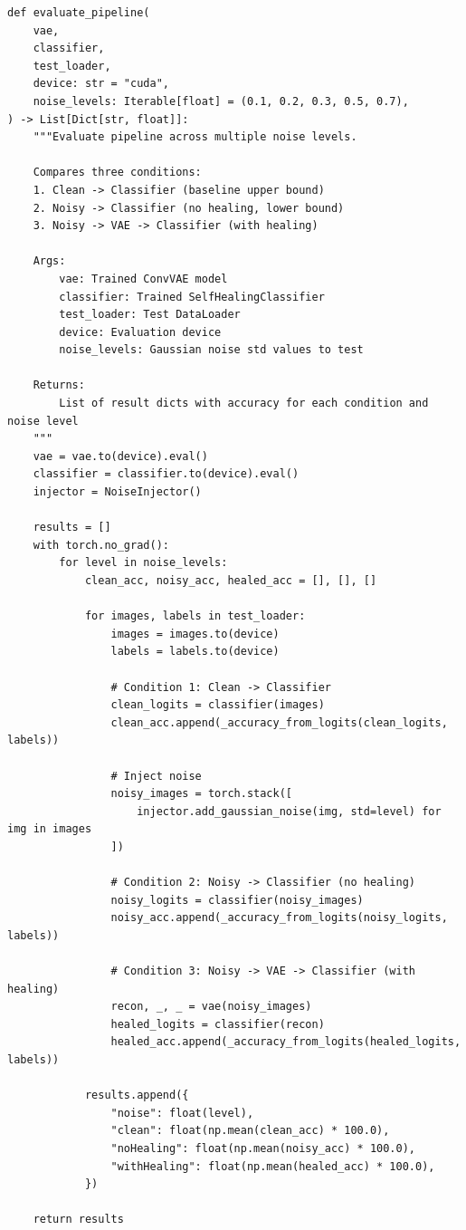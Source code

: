 \documentclass[11pt,a4paper]{article}
\begin{document}
\begin{lstlisting}[caption={src/evaluate.py - Pipeline Evaluation}, label={lst:evaluate-pipeline}]
def evaluate_pipeline(
    vae,
    classifier,
    test_loader,
    device: str = "cuda",
    noise_levels: Iterable[float] = (0.1, 0.2, 0.3, 0.5, 0.7),
) -> List[Dict[str, float]]:
    """Evaluate pipeline across multiple noise levels.

    Compares three conditions:
    1. Clean -> Classifier (baseline upper bound)
    2. Noisy -> Classifier (no healing, lower bound)
    3. Noisy -> VAE -> Classifier (with healing)

    Args:
        vae: Trained ConvVAE model
        classifier: Trained SelfHealingClassifier
        test_loader: Test DataLoader
        device: Evaluation device
        noise_levels: Gaussian noise std values to test

    Returns:
        List of result dicts with accuracy for each condition and noise level
    """
    vae = vae.to(device).eval()
    classifier = classifier.to(device).eval()
    injector = NoiseInjector()

    results = []
    with torch.no_grad():
        for level in noise_levels:
            clean_acc, noisy_acc, healed_acc = [], [], []

            for images, labels in test_loader:
                images = images.to(device)
                labels = labels.to(device)

                # Condition 1: Clean -> Classifier
                clean_logits = classifier(images)
                clean_acc.append(_accuracy_from_logits(clean_logits, labels))

                # Inject noise
                noisy_images = torch.stack([
                    injector.add_gaussian_noise(img, std=level) for img in images
                ])

                # Condition 2: Noisy -> Classifier (no healing)
                noisy_logits = classifier(noisy_images)
                noisy_acc.append(_accuracy_from_logits(noisy_logits, labels))

                # Condition 3: Noisy -> VAE -> Classifier (with healing)
                recon, _, _ = vae(noisy_images)
                healed_logits = classifier(recon)
                healed_acc.append(_accuracy_from_logits(healed_logits, labels))

            results.append({
                "noise": float(level),
                "clean": float(np.mean(clean_acc) * 100.0),
                "noHealing": float(np.mean(noisy_acc) * 100.0),
                "withHealing": float(np.mean(healed_acc) * 100.0),
            })

    return results
\end{lstlisting}
\end{document}
